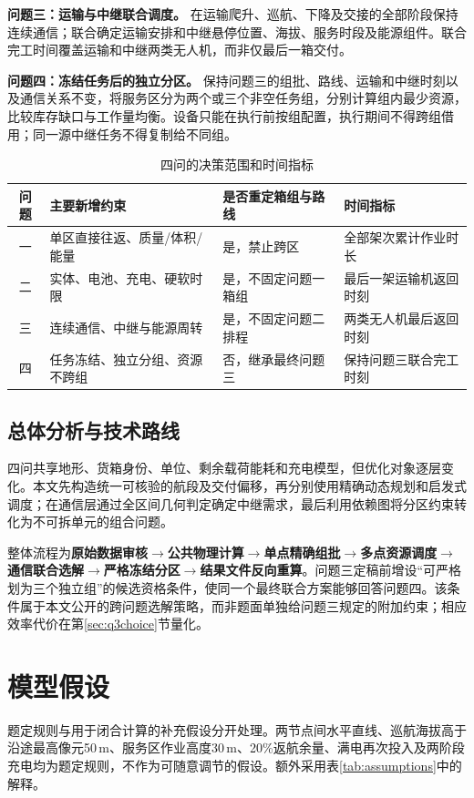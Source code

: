 \documentclass[a4paper]{my_paper}%
\numberwithin{equation}{section}
\theoremstyle{definition}
\begin{document}
\textbf{问题三：运输与中继联合调度。} 在运输爬升、巡航、下降及交接的全部阶段保持连续通信；联合确定运输安排和中继悬停位置、海拔、服务时段及能源组件。联合完工时间覆盖运输和中继两类无人机，而非仅最后一箱交付。

\textbf{问题四：冻结任务后的独立分区。} 保持问题三的组批、路线、运输和中继时刻以及通信关系不变，将服务区分为两个或三个非空任务组，分别计算组内最少资源，比较库存缺口与工作量均衡。设备只能在执行前按组配置，执行期间不得跨组借用；同一源中继任务不得复制给不同组。

\begin{table}[htbp]\centering\small
\caption{四问的决策范围和时间指标}\label{tab:scope}
\begin{tabularx}{\linewidth}{@{}cYYY@{}}\toprule
问题 & 主要新增约束 & 是否重定箱组与路线 & 时间指标\\\midrule
一 & 单区直接往返、质量/体积/能量 & 是，禁止跨区 & 全部架次累计作业时长\\
二 & 实体、电池、充电、硬软时限 & 是，不固定问题一箱组 & 最后一架运输机返回时刻\\
三 & 连续通信、中继与能源周转 & 是，不固定问题二排程 & 两类无人机最后返回时刻\\
四 & 任务冻结、独立分组、资源不跨组 & 否，继承最终问题三 & 保持问题三联合完工时刻\\\bottomrule
\end{tabularx}
\end{table}

\subsection{总体分析与技术路线}
四问共享地形、货箱身份、单位、剩余载荷能耗和充电模型，但优化对象逐层变化。本文先构造统一可核验的航段及交付偏移，再分别使用精确动态规划和启发式调度；在通信层通过全区间几何判定确定中继需求，最后利用依赖图将分区约束转化为不可拆单元的组合问题。

整体流程为\textbf{原始数据审核$\to$公共物理计算$\to$单点精确组批$\to$多点资源调度$\to$通信联合选解$\to$严格冻结分区$\to$结果文件反向重算}。问题三定稿前增设“可严格划为三个独立组”的候选资格条件，使同一个最终联合方案能够回答问题四。该条件属于本文公开的跨问题选解策略，而非题面单独给问题三规定的附加约束；相应效率代价在第\ref{sec:q3choice}节量化。

\section{模型假设}
题定规则与用于闭合计算的补充假设分开处理。两节点间水平直线、巡航海拔高于沿途最高像元50\,m、服务区作业高度30\,m、20\%返航余量、满电再次投入及两阶段充电均为题定规则\cite{problem}，不作为可随意调节的假设。额外采用表\ref{tab:assumptions}中的解释。
\end{document}
